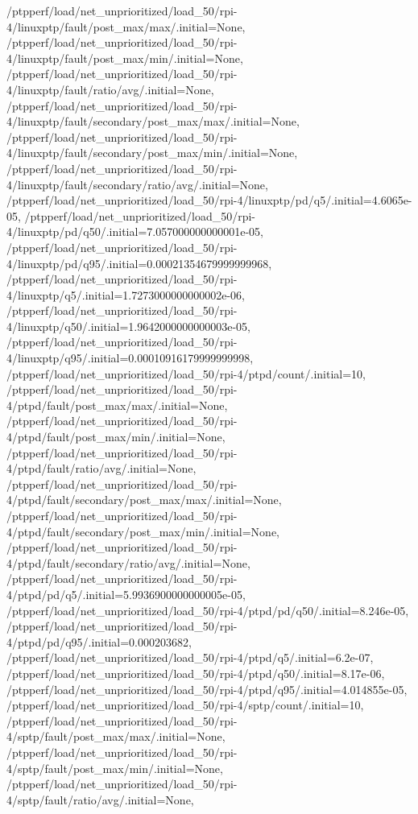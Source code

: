 {    /ptpperf/load/net_unprioritized/load_50/rpi-4/linuxptp/fault/post_max/max/.initial=None,
    /ptpperf/load/net_unprioritized/load_50/rpi-4/linuxptp/fault/post_max/min/.initial=None,
    /ptpperf/load/net_unprioritized/load_50/rpi-4/linuxptp/fault/ratio/avg/.initial=None,
    /ptpperf/load/net_unprioritized/load_50/rpi-4/linuxptp/fault/secondary/post_max/max/.initial=None,
    /ptpperf/load/net_unprioritized/load_50/rpi-4/linuxptp/fault/secondary/post_max/min/.initial=None,
    /ptpperf/load/net_unprioritized/load_50/rpi-4/linuxptp/fault/secondary/ratio/avg/.initial=None,
    /ptpperf/load/net_unprioritized/load_50/rpi-4/linuxptp/pd/q5/.initial=4.6065e-05,
    /ptpperf/load/net_unprioritized/load_50/rpi-4/linuxptp/pd/q50/.initial=7.057000000000001e-05,
    /ptpperf/load/net_unprioritized/load_50/rpi-4/linuxptp/pd/q95/.initial=0.00021354679999999968,
    /ptpperf/load/net_unprioritized/load_50/rpi-4/linuxptp/q5/.initial=1.7273000000000002e-06,
    /ptpperf/load/net_unprioritized/load_50/rpi-4/linuxptp/q50/.initial=1.9642000000000003e-05,
    /ptpperf/load/net_unprioritized/load_50/rpi-4/linuxptp/q95/.initial=0.00010916179999999998,
    /ptpperf/load/net_unprioritized/load_50/rpi-4/ptpd/count/.initial=10,
    /ptpperf/load/net_unprioritized/load_50/rpi-4/ptpd/fault/post_max/max/.initial=None,
    /ptpperf/load/net_unprioritized/load_50/rpi-4/ptpd/fault/post_max/min/.initial=None,
    /ptpperf/load/net_unprioritized/load_50/rpi-4/ptpd/fault/ratio/avg/.initial=None,
    /ptpperf/load/net_unprioritized/load_50/rpi-4/ptpd/fault/secondary/post_max/max/.initial=None,
    /ptpperf/load/net_unprioritized/load_50/rpi-4/ptpd/fault/secondary/post_max/min/.initial=None,
    /ptpperf/load/net_unprioritized/load_50/rpi-4/ptpd/fault/secondary/ratio/avg/.initial=None,
    /ptpperf/load/net_unprioritized/load_50/rpi-4/ptpd/pd/q5/.initial=5.9936900000000005e-05,
    /ptpperf/load/net_unprioritized/load_50/rpi-4/ptpd/pd/q50/.initial=8.246e-05,
    /ptpperf/load/net_unprioritized/load_50/rpi-4/ptpd/pd/q95/.initial=0.000203682,
    /ptpperf/load/net_unprioritized/load_50/rpi-4/ptpd/q5/.initial=6.2e-07,
    /ptpperf/load/net_unprioritized/load_50/rpi-4/ptpd/q50/.initial=8.17e-06,
    /ptpperf/load/net_unprioritized/load_50/rpi-4/ptpd/q95/.initial=4.014855e-05,
    /ptpperf/load/net_unprioritized/load_50/rpi-4/sptp/count/.initial=10,
    /ptpperf/load/net_unprioritized/load_50/rpi-4/sptp/fault/post_max/max/.initial=None,
    /ptpperf/load/net_unprioritized/load_50/rpi-4/sptp/fault/post_max/min/.initial=None,
    /ptpperf/load/net_unprioritized/load_50/rpi-4/sptp/fault/ratio/avg/.initial=None,
}
